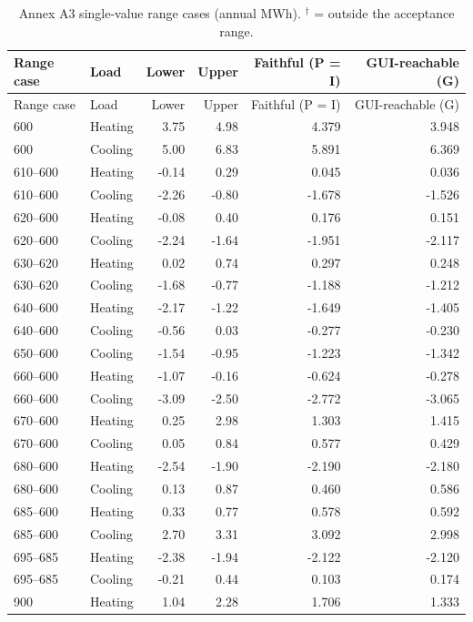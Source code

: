 \documentclass[10pt,a4paper]{article}
\begin{document}
{\small\setlength{\tabcolsep}{5pt}
\begin{longtable}{llrrrr}
\caption{Annex A3 single-value range cases (annual MWh). $^{\dagger}$ = outside the acceptance range.}\label{tab:single}\\
\toprule Range case & Load & Lower & Upper & Faithful (P = I) & GUI-reachable (G)\\\midrule\endfirsthead
\toprule Range case & Load & Lower & Upper & Faithful (P = I) & GUI-reachable (G)\\\midrule\endhead
600 & Heating & 3.75 & 4.98 & 4.379 & 3.948 \\
600 & Cooling & 5.00 & 6.83 & 5.891 & 6.369 \\
610--600 & Heating & -0.14 & 0.29 & 0.045 & 0.036 \\
610--600 & Cooling & -2.26 & -0.80 & -1.678 & -1.526 \\
620--600 & Heating & -0.08 & 0.40 & 0.176 & 0.151 \\
620--600 & Cooling & -2.24 & -1.64 & -1.951 & -2.117 \\
630--620 & Heating & 0.02 & 0.74 & 0.297 & 0.248 \\
630--620 & Cooling & -1.68 & -0.77 & -1.188 & -1.212 \\
640--600 & Heating & -2.17 & -1.22 & -1.649 & -1.405 \\
640--600 & Cooling & -0.56 & 0.03 & -0.277 & -0.230 \\
650--600 & Cooling & -1.54 & -0.95 & -1.223 & -1.342 \\
660--600 & Heating & -1.07 & -0.16 & -0.624 & -0.278 \\
660--600 & Cooling & -3.09 & -2.50 & -2.772 & -3.065 \\
670--600 & Heating & 0.25 & 2.98 & 1.303 & 1.415 \\
670--600 & Cooling & 0.05 & 0.84 & 0.577 & 0.429 \\
680--600 & Heating & -2.54 & -1.90 & -2.190 & -2.180 \\
680--600 & Cooling & 0.13 & 0.87 & 0.460 & 0.586 \\
685--600 & Heating & 0.33 & 0.77 & 0.578 & 0.592 \\
685--600 & Cooling & 2.70 & 3.31 & 3.092 & 2.998 \\
695--685 & Heating & -2.38 & -1.94 & -2.122 & -2.120 \\
695--685 & Cooling & -0.21 & 0.44 & 0.103 & 0.174 \\
\midrule
900 & Heating & 1.04 & 2.28 & 1.706 & 1.333 \\

\end{longtable}}
\end{document}
